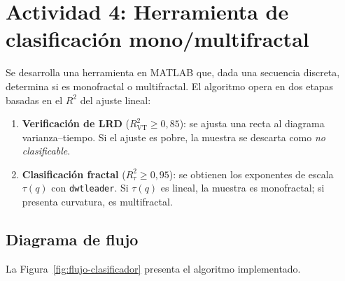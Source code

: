 \section{Actividad 4: Herramienta de clasificación mono/multifractal}

Se desarrolla una herramienta en MATLAB que, dada una secuencia discreta,
determina si es monofractal o multifractal. El algoritmo opera en dos etapas
basadas en el $R^2$ del ajuste lineal:

\begin{enumerate}[nosep]
    \item \textbf{Verificación de LRD} ($R^2_{\text{VT}} \geq 0{,}85$): se
          ajusta una recta al diagrama varianza--tiempo. Si el ajuste es pobre,
          la muestra se descarta como \emph{no clasificable}.
    \item \textbf{Clasificación fractal} ($R^2_{\tau} \geq 0{,}95$): se
          obtienen los exponentes de escala $\tau(q)$ con \texttt{dwtleader}.
          Si $\tau(q)$ es lineal, la muestra es monofractal; si presenta
          curvatura, es multifractal.
\end{enumerate}

\subsection{Diagrama de flujo}

La Figura~\ref{fig:flujo-clasificador} presenta el algoritmo implementado.

